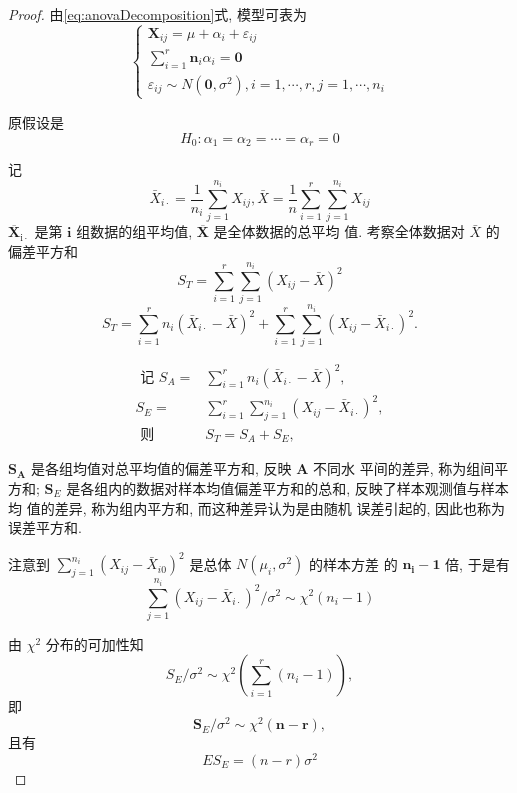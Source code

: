 \begin{proof}
    由\cref{eq:anovaDecomposition}式, 模型可表为
    $$
    \left\{\begin{array}{l}
    \boldsymbol{X}_{i j}=\mu+\alpha_{i}+\varepsilon_{i j} \\
    \sum_{i=1}^{r} \boldsymbol{n}_{i} \alpha_{i}=\mathbf{0} \\
    \varepsilon_{i j} \sim N\left(\mathbf{0}, \sigma^{2}\right), i=1, \cdots, r, j=1, \cdots, n_{i}
    \end{array}\right.
    $$
    
    原假设是
    $$
    H_{0}: \alpha_{1}=\alpha_{2}=\cdots=\alpha_{r}=0
    $$
    
    记
    $$
    \bar{X}_{i \cdot}=\frac{1}{n_{i}} \sum_{j=1}^{n_{i}} X_{i j}, \bar{X}=\frac{1}{n} \sum_{i=1}^{r} \sum_{j=1}^{n_{i}} X_{i j}
    $$
    \( \overline{\boldsymbol{X}}_{\mathrm{i} \cdot} \) 是第 \( \boldsymbol{i} \) 组数据的组平均值, \( \overline{\boldsymbol{X}} \) 是全体数据的总平均
    值. 考察全体数据对 \( \bar{X} \) 的偏差平方和
    $$
    S_{T}=\sum_{i=1}^{r} \sum_{j=1}^{n_{i}}\left(X_{i j}-\bar{X}\right)^{2}
    $$
    $$
    S_{T}=\sum_{i=1}^{r} n_{i}\left(\bar{X}_{i \cdot}-\bar{X}\right)^{2}+\sum_{i=1}^{r} \sum_{j=1}^{n_{i}}\left(X_{i j}-\bar{X}_{i \cdot}\right)^{2} .
    $$
    
    $$ \begin{aligned} \text { 记 } S_{A}=& \sum_{i=1}^{r} n_{i}\left(\bar{X}_{i \cdot}-\bar{X}\right)^{2}, \\ S_{E}=& \sum_{i=1}^{r} \sum_{j=1}^{n_{i}}\left(X_{i j}-\bar{X}_{i \cdot}\right)^{2}, \\ \text { 则 } & S_{T}=S_{A}+S_{E}, \end{aligned} $$
    
    \( \boldsymbol{S}_{\boldsymbol{A}} \) 是各组均值对总平均值的偏差平方和, 反映 \( \boldsymbol{A} \) 不同水
    平间的差异, 称为组间平方和; \( \boldsymbol{S}_{E} \) 是各组内的数据对样本均值偏差平方和的总和, 反映了样本观测值与样本均
    值的差异, 称为组内平方和, 而这种差异认为是由随机
    误差引起的, 因此也称为误差平方和. 
    
    注意到 \( \sum_{j=1}^{n_{i}}\left(X_{i j}-\bar{X}_{i 0}\right)^{2} \) 是总体 \( N\left(\mu_{i}, \sigma^{2}\right) \) 的样本方差
    的 \( \boldsymbol{n}_{\boldsymbol{i}}-\mathbf{1} \) 倍, 于是有
    $$
    \sum_{j=1}^{n_{i}}\left(X_{i j}-\bar{X}_{i \cdot}\right)^{2} / \sigma^{2} \sim \chi^{2}\left(n_{i}-1\right)
    $$
    
    由 \( \chi^{2} \) 分布的可加性知
    $$
    S_{E} / \sigma^{2} \sim \chi^{2}\left(\sum_{i=1}^{r}\left(n_{i}-1\right)\right),
    $$
    即
    $$
    \boldsymbol{S}_{E} / \sigma^{2} \sim \chi^{2}(\boldsymbol{n}-\boldsymbol{r}),
    $$
    且有
    $$
    E S_{E}=(n-r) \sigma^{2}
    $$
    

\end{proof}
